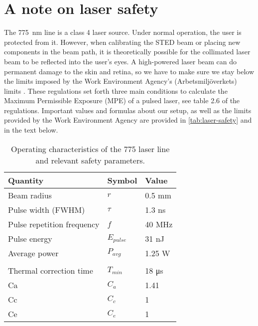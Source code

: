 
\section{A note on laser safety}

The \SI{775}{nm} line is a class 4 laser source. Under normal operation, the user is protected from it. However, when calibrating the STED beam or placing new components in the beam path, it is theoretically possible for the collimated laser beam to be reflected into the user's eyes. A high-powered laser beam can do permanent damage to the skin and retina, so we have to make sure we stay below the limits imposed by the Work Environment Agency's (Arbetsmiljöverkets) limits \cite{AFS2009:7}. These regulations set forth three main conditions to calculate the Maximum Permissible Exposure (MPE) of a pulsed laser, see table 2.6 of the regulations. Important values and formulas about our setup, as well as the limits provided by the Work Environment Agency are provided in \autoref{tab:laser-safety} and in the text below.

\begin{table}[h]
	\centering
	\caption{Operating characteristics of the 775 laser line and relevant safety parameters. }
	\begin{tabular}{lll}
		\toprule
		Quantity                   & Symbol               & Value                 \\ \midrule
		Beam radius                & $ r $                & 0.5 mm                \\
		Pulse width (FWHM)         & $ \tau $             & 1.3 ns                \\
		Pulse repetition frequency & $ f $                & 40 MHz                \\
		Pulse energy               & $ E_\mathit{pulse} $ & 31 nJ                 \\
		Average power              & $P_\mathit{avg} $    & 1.25 W                \\ \\
		Thermal correction time    & $ T_\mathit{min} $   & 18 \si{\micro\second} \\
		Ca                         & $ C_a $              & 1.41                  \\
		Cc                         & $ C_c $              & 1                     \\
		Ce                         & $ C_e $              & 1                     \\ \bottomrule
	\end{tabular}
	\label{tab:laser-safety}
\end{table}

